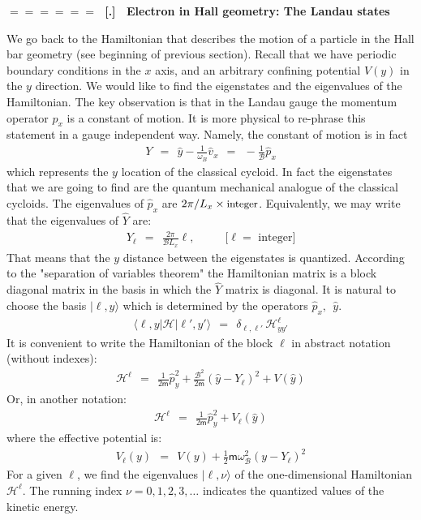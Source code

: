 \documentclass[onecolumn,fleqn]{revtex4}
\newcommand{\mass}{\mathsf{m}}
\newcommand{\beq}{\begin{eqnarray}}
\newcommand{\eeq}{\end{eqnarray}}
\renewcommand{\thesubsection}{\arabic{subsection}}
\renewcommand{\thesubsubsection}{\arabic{subsubsection}}
\newcommand{\sheadC}[1]
{
\addtocounter{subsubsection}{1}
\vspace{5mm}
{\Large\bf $=\!=\!=\!=\!=\!=\;$ [\thesubsection.\thesubsubsection] \ #1}  
\nopagebreak
\phantomsection
}
\begin{document}
\sheadC{Electron in Hall geometry: The Landau states} 

We go back to the Hamiltonian that describes the motion of a particle 
in the Hall bar geometry (see beginning of previous section).  
Recall that we have periodic boundary conditions 
in the $x$ axis, and an arbitrary confining potential $V(y)$ 
in the $y$ direction. We would like to find the eigenstates and 
the eigenvalues of the Hamiltonian. 
The key observation is that in the Landau gauge the 
momentum operator $p_x$ is a constant of motion.
It is more physical to re-phrase this statement 
in a gauge independent way. Namely, the constant 
of motion is in fact   
\beq
Y \ \ = \ \ \hat{y}-\frac{1}{\omega_B}\hat{v}_x
\ \ = \ \ -\frac{1}{\mathcal{B}}\hat{p}_x 
\eeq
which represents the $y$ location of the classical cycloid. 
In fact the eigenstates that we are going to find 
are the quantum mechanical analogue of the classical cycloids. 
The eigenvalues of ${\hat{p}_x }$ 
are ${ {2 \pi}/{L_x} \times \mbox{\small integer} }$. 
Equivalently, we may write that the eigenvalues 
of ${\hat{Y} }$ are:
\beq
Y_{\ell} \ \ = \ \ \frac{2 \pi}{\mathcal{B}L_x}\ell,  
\ \ \ \ \ \ \ \ \ \ \ \ 
\mbox{[$\ell =$ integer]} 
\eeq
That means that the $y$ distance between the eigenstates  
is quantized. According to the "separation of variables theorem"  
the Hamiltonian matrix is a block diagonal matrix 
in the basis in which the ${\hat{Y}}$ matrix is diagonal. 
It is natural to choose the basis ${|\ell, y \rangle}$ 
which is determined by the operators ${\hat{p}_x, \ \ \hat{y}}$.
\beq
\langle \ell, y | \mathcal{H} | \ell', y' \rangle \ \ 
= \ \ \delta_{\ell,\ell'} \, \mathcal{H}^{\ell}_{yy'} 
\eeq
It is convenient to write the Hamiltonian 
of the block ${\ell}$ in abstract notation (without indexes):
\beq
\mathcal{H}^{\ell} 
\ \ = \ \ \frac{1}{2\mass}\hat{p}^2_y 
+ \frac{\mathcal{B}^2}{2\mass} ( \hat{y}-Y_{\ell} )^2 + V( \hat{y} ) 
\eeq
Or, in another notation:
\beq
\mathcal{H}^{\ell} 
\ \ = \ \ \frac{1}{2\mass}\hat{p}^2_y + V_{\ell} ( \hat{y} ) 
\eeq
where the effective potential is:
\beq
V_{\ell} (y) 
\ \ = \ \ V(y) + \frac{1}{2}\mass \omega_\mathcal{B}^2 ( y - Y_{\ell} )^2 
\eeq
For a given ${\ell}$, we find the 
eigenvalues ${| \ell, \nu \rangle}$ of 
the one-dimensional Hamiltonian ${\mathcal{H}^{\ell}}$. 
The running index ${\nu=0,1,2,3, \dots }$ 
indicates the quantized values of the kinetic energy.
\end{document}
